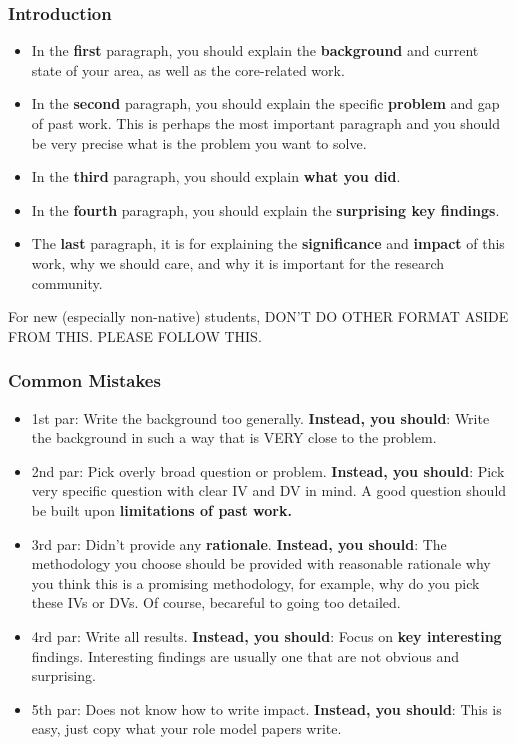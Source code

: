 \documentclass{beamer}
\begin{document}
\begin{frame}
\frametitle{Introduction} 
\footnotesize
\begin{itemize}
	\item In the \textbf{first} paragraph, you should explain the \textbf{background} and current state of your area, as well as the core-related work.   
	\item In the \textbf{second} paragraph, you should explain the specific \textbf{problem} and gap of past work.  This is perhaps the most important paragraph and you should be very precise what is the problem you want to solve.   
	\item In the \textbf{third} paragraph, you should explain \textbf{what you did}.  
	\item In the \textbf{fourth} paragraph, you should explain the \textbf{surprising key findings}. 
	\item The \textbf{last} paragraph, it is for explaining the \textbf{significance} and \textbf{impact} of this work, why we should care, and why it is important for the research community.  
\end{itemize}
For new (especially non-native) students, DON’T DO OTHER FORMAT ASIDE FROM THIS. PLEASE FOLLOW THIS.
\end{frame}

\begin{frame}
\frametitle{Common Mistakes} 
\footnotesize
\begin{itemize}
	\item 1st par: Write the background too generally.   \textbf{Instead, you should}:  Write the background in such a way that is VERY close to the problem.  
	\item 2nd par:  Pick overly broad question or problem.    \textbf{Instead, you should}:  Pick very specific question with clear IV and DV in mind.    A good question should be built upon\textbf{ limitations of past work.}
	\item 3rd par:  Didn't provide any \textbf{rationale}.   \textbf{Instead, you should}:   The methodology you choose should be provided with reasonable rationale why you think this is a promising methodology, for example, why do you pick these IVs or DVs.    Of course, becareful to going too detailed.   
	\item 4rd par:  Write all results.  \textbf{Instead, you should}:  Focus on \textbf{key interesting} findings.   Interesting findings are usually one that are not obvious and surprising.
	\item 5th par:  Does not know how to write impact.   \textbf{Instead, you should}:  This is easy, just copy what your role model papers write.
\end{itemize}
\end{frame}
\end{document}

